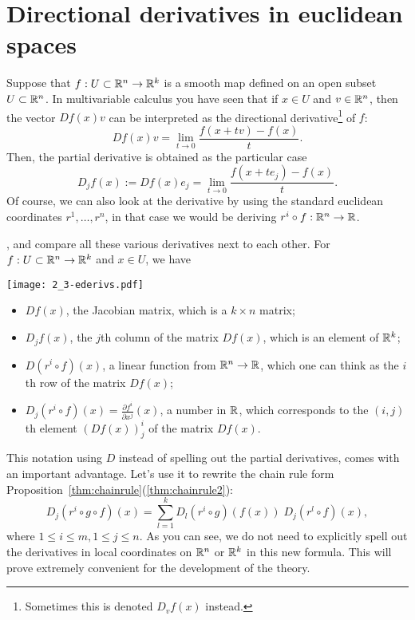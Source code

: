 \section{Directional derivatives in euclidean spaces}\label{sec:dd}

Suppose that $f: U\subset\mathbb{R}^n\to\mathbb{R}^k$ is a smooth map defined on an open subset $U\subset \mathbb{R}^n$.
In multivariable calculus you have seen that if $x\in U$ and $v\in\mathbb{R}^n$, then the vector $Df(x) v$ can be interpreted as the directional derivative\footnote{Sometimes this is denoted $D_v f(x)$ instead.} of $f$:
\begin{equation}
  Df(x) v = \lim_{t\to0}\frac{f(x+tv) - f(x)}{t}.
\end{equation}
Then, the partial derivative is obtained as the particular case
\begin{equation}
  D_jf(x) := Df(x) e_j = \lim_{t\to0} \frac{f(x+te_j) - f(x)}{t}.
\end{equation}
Of course, we can also look at the derivative by using the standard euclidean coordinates $r^1, \ldots, r^n$, in that case we would be deriving $r^i \circ f : \mathbb{R}^n \to \mathbb{R}$.

, and compare all these various derivatives next to each other.
For $f:U\subset\mathbb{R}^n\to\mathbb{R}^k$ and $x\in U$, we have
\begin{marginfigure}[3.5cm]
  \texttt{[image: 2\_3-ederivs.pdf]}
\end{marginfigure}
\begin{itemize}
  \item $Df(x)$, the Jacobian matrix, which is a $k\times n$ matrix;
  \item $D_j f(x)$, the $j$th column of the matrix $Df(x)$, which is an element of $\mathbb{R}^k$;
  \item $D(r^i\circ f)(x)$, a linear function from $\mathbb{R}^n \to \mathbb{R}$, which one can think as the $i$th row of the matrix $Df(x)$;
  \item $D_j(r^i\circ f)(x) = \frac{\partial f^i}{\partial x^j}(x)$, a number in $\mathbb{R}$, which corresponds to the $(i,j)$th element $(Df(x))_j^i$ of the matrix $Df(x)$.
\end{itemize}

This notation using $D$ instead of spelling out the partial derivatives, comes with an important advantage.
Let's use it to rewrite the chain rule form Proposition~\ref{thm:chainrule}(\ref{thm:chainrule2}):
\begin{equation}
  D_j(r^i\circ g \circ f) (x) = \sum_{l=1}^k D_l(r^i\circ g)(f(x))\; D_j(r^l \circ f)(x),
\end{equation}
where $1\leq i\leq m, 1\leq j \leq n$.
As you can see, we do not need to explicitly spell out the derivatives in local coordinates on $\mathbb{R}^n$ or $\mathbb{R}^k$ in this new formula.
This will prove extremely convenient for the development of the theory.

